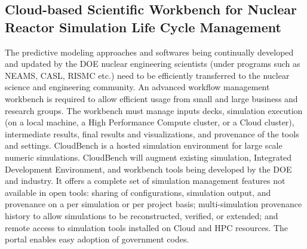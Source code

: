
\subsection{Cloud-based Scientific Workbench for Nuclear Reactor Simulation Life Cycle Management}
The predictive modeling approaches and softwares being continually developed and updated by the DOE nuclear engineering scientists (under programs such as NEAMS, CASL, RISMC etc.) need to be efficiently transferred to the nuclear science and engineering community. An advanced workflow management workbench is required to allow efficient usage from small and large business and research groups. The workbench must manage inputs decks, simulation execution (on a local machine, a High Performance Compute cluster, or a Cloud cluster), intermediate results, final results and visualizations, and provenance of the tools and settings. CloudBench is a hosted simulation environment for large scale numeric simulations. CloudBench will augment existing simulation, Integrated Development Environment, and workbench tools being developed by the DOE and industry. It offers a complete set of simulation management features not available in open tools: sharing of configurations, simulation output, and provenance on a per simulation or per project basis; multi-simulation provenance history to allow simulations to be reconstructed, verified, or extended; and remote access to simulation tools installed on Cloud and HPC resources. The portal enables easy adoption of government codes. 

